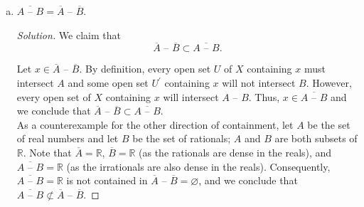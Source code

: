 \documentclass[11pt]{article}
\newcommand{\R}{\mathbb{R}}
\newenvironment{solution}
  {\renewcommand\qedsymbol{$\blacksquare$}\begin{proof}[Solution]}
  {\end{proof}}
\begin{document}
\begin{enumerate}[a)]
	\item $\overline{A \text{ -- } B} = \overline{A} \text{ -- } \overline{B}$. 
	
	\begin{solution}
	We claim that
	\[
		\boxed{\overline{A} \text{ -- } \overline{B} \subset \overline{A \text{ -- } B}}.
	\]

	Let $x \in \overline{A} \text{ -- } \overline{B}$. By definition, every open set $U$ of $X$ containing $x$ must intersect $A$ and some open set $U^{\prime}$ containing $x$ will not intersect $B$. 
	However, every open set of $X$ containing $x$ will intersect $A \text{ -- } B$. Thus, $x \in \overline{A \text{ -- } B}$ and we conclude that $\overline{A} \text{ -- } \overline{B} \subset \overline{A \text{ -- } B}$. \\

	As a counterexample for the other direction of containment, let $A$ be the set of real numbers and let $B$ be the set of rationals; $A$ and $B$ are both subsets of $\R$. 
	Note that $\overline{A} = \R$, $\overline{B}  = \R$ (as the rationals are dense in the reals), and $\overline{A \text{ -- } B} = \R$ (as the irrationals are also dense in the reals). 
	Consequently, $\overline{A \text{ -- } B} = \R$ is not contained in $\overline{A} \text{ -- } \overline{B} = \varnothing$, and we conclude that $\overline{A \text{ -- } B} \not\subset \overline{A} \text{ -- } \overline{B}$. 	\end{solution}
\end{enumerate}
\end{document}
